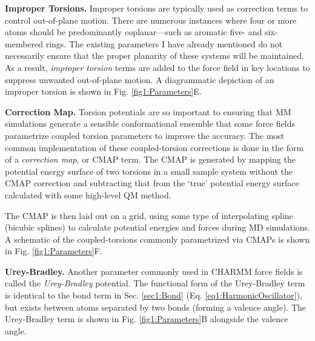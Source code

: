 \textbf{Improper Torsions.} Improper torsions are typically used as correction
terms to control out-of-plane motion. There are numerous instances where four or
more atoms should be predominantly coplanar---such as aromatic five- and
six-membered rings. The existing parameters I have already mentioned do not
necessarily ensure that the proper planarity of these systems will be
maintained. As a result, \emph{improper torsion} terms are added to the force
field in key locations to suppress unwanted out-of-plane motion. A diagrammatic
depiction of an improper torsion is shown in Fig. \ref{fig1:Parameters}E.

\textbf{Correction Map.} Torsion potentials are so important to ensuring that MM
simulations generate a sensible conformational ensemble that some force fields
parametrize coupled torsion parameters to improve the accuracy. The most common
implementation of these coupled-torsion corrections is done in the form of a
\emph{correction map}, or CMAP term. \cite{MacKerell_JComputChem_2004_v25_p1400}
The CMAP is generated by mapping the potential energy surface of two torsions in
a small sample system without the CMAP correction and subtracting that from the
`true' potential energy surface calculated with some high-level QM method.

The CMAP is then laid out on a grid, using some type of interpolating spline
(\eg bicubic splines) to calculate potential energies and forces during MD
simulations. A schematic of the coupled-torsions commonly parametrized via CMAPs
is shown in Fig. \ref{fig1:Parameters}F.

\textbf{Urey-Bradley.} Another parameter commonly used in CHARMM force fields
\cite{MacKerell_JPhysChemB_1998_v102_p3586} is called the \emph{Urey-Bradley}
potential. The functional form of the Urey-Bradley term is identical to the bond
term in Sec. \ref{sec1:Bond} (Eq. \ref{eq1:HarmonicOscillator}), but exists
between atoms separated by two bonds (\ie forming a valence angle). The
Urey-Bradley term is shown in Fig. \ref{fig1:Parameters}B alongside the valence
angle.

